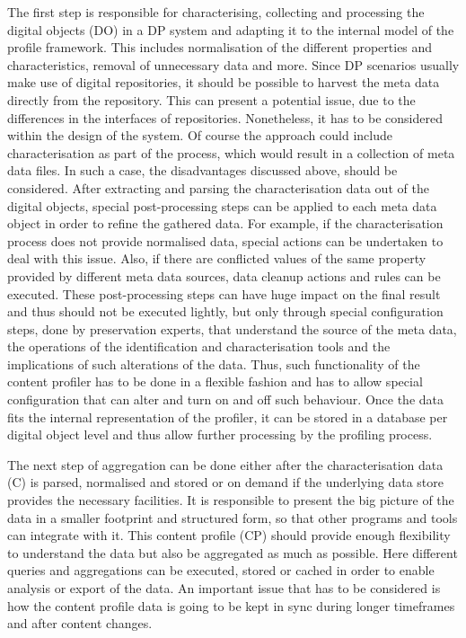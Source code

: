 The first step is responsible for characterising, collecting and processing the digital objects (DO) in a DP system and adapting it to the internal model of the profile framework. This includes normalisation of the different properties and characteristics, removal of unnecessary data and more. Since DP scenarios usually make use of digital repositories, it should be possible to harvest the meta data directly from the repository. This can present a potential issue, due to the differences in the interfaces of repositories. Nonetheless, it has to be considered within the design of the system. Of course the approach could include characterisation as part of the process, which would result in a collection of meta data files. In such a case, the disadvantages discussed above, should be considered. After extracting and parsing the characterisation data out of the digital objects, special post-processing steps can be applied to each meta data object in order to refine the gathered data. For example, if the characterisation process does not provide normalised data, special actions can be undertaken to deal with this issue. Also, if there are conflicted values of the same property provided by different meta data sources, data cleanup actions and rules can be executed. These post-processing steps can have huge impact on the final result and thus should not be executed lightly, but only through special configuration steps, done by preservation experts, that understand the source of the meta data, the operations of the identification and characterisation tools and the implications of such alterations of the data. Thus, such functionality of the content profiler has to be done in a flexible fashion and has to allow special configuration that can alter and turn on and off such behaviour. Once the data fits the internal representation of the profiler, it can be stored in a database per digital object level and thus allow further processing by the profiling process.

The next step of aggregation can be done either after the characterisation data (C) is parsed, normalised and stored or on demand if the underlying data store provides the necessary facilities. It is responsible to present the big picture of the data in a smaller footprint and structured form, so that other programs and tools can integrate with it. This content profile (CP) should provide enough flexibility to understand the data but also be aggregated as much as possible. Here different queries and aggregations can be executed, stored or cached in order to enable analysis or export of the data. An important issue that has to be considered is how the content profile data is going to be kept in sync during longer timeframes and after content changes. 

